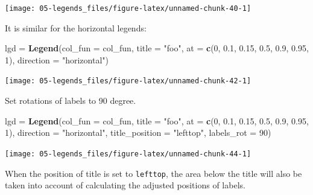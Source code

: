 \documentclass[]{book}
\newenvironment{Shaded}{\begin{snugshade}}{\end{snugshade}}
\newcommand{\KeywordTok}[1]{\textcolor[rgb]{0.13,0.29,0.53}{\textbf{#1}}}
\newcommand{\DataTypeTok}[1]{\textcolor[rgb]{0.13,0.29,0.53}{#1}}
\newcommand{\DecValTok}[1]{\textcolor[rgb]{0.00,0.00,0.81}{#1}}
\newcommand{\FloatTok}[1]{\textcolor[rgb]{0.00,0.00,0.81}{#1}}
\newcommand{\StringTok}[1]{\textcolor[rgb]{0.31,0.60,0.02}{#1}}
\newcommand{\NormalTok}[1]{#1}
\theoremstyle{definition}
\theoremstyle{definition}
\theoremstyle{definition}
\theoremstyle{remark}
\begin{document}
\begin{center}\texttt{[image: 05-legends\_files/figure-latex/unnamed-chunk-40-1]} \end{center}

It is similar for the horizontal legends:

\begin{Shaded}
\begin{Highlighting}[]
\NormalTok{lgd =}\StringTok{ }\KeywordTok{Legend}\NormalTok{(}\DataTypeTok{col_fun =}\NormalTok{ col_fun, }\DataTypeTok{title =} \StringTok{"foo"}\NormalTok{, }\DataTypeTok{at =} \KeywordTok{c}\NormalTok{(}\DecValTok{0}\NormalTok{, }\FloatTok{0.1}\NormalTok{, }\FloatTok{0.15}\NormalTok{, }\FloatTok{0.5}\NormalTok{, }\FloatTok{0.9}\NormalTok{, }\FloatTok{0.95}\NormalTok{, }\DecValTok{1}\NormalTok{),}
    \DataTypeTok{direction =} \StringTok{"horizontal"}\NormalTok{)}
\end{Highlighting}
\end{Shaded}

\begin{center}\texttt{[image: 05-legends\_files/figure-latex/unnamed-chunk-42-1]} \end{center}

Set rotations of labels to 90 degree.

\begin{Shaded}
\begin{Highlighting}[]
\NormalTok{lgd =}\StringTok{ }\KeywordTok{Legend}\NormalTok{(}\DataTypeTok{col_fun =}\NormalTok{ col_fun, }\DataTypeTok{title =} \StringTok{"foo"}\NormalTok{, }\DataTypeTok{at =} \KeywordTok{c}\NormalTok{(}\DecValTok{0}\NormalTok{, }\FloatTok{0.1}\NormalTok{, }\FloatTok{0.15}\NormalTok{, }\FloatTok{0.5}\NormalTok{, }\FloatTok{0.9}\NormalTok{, }\FloatTok{0.95}\NormalTok{, }\DecValTok{1}\NormalTok{),}
    \DataTypeTok{direction =} \StringTok{"horizontal"}\NormalTok{, }\DataTypeTok{title_position =} \StringTok{"lefttop"}\NormalTok{, }\DataTypeTok{labels_rot =} \DecValTok{90}\NormalTok{)}
\end{Highlighting}
\end{Shaded}

\begin{center}\texttt{[image: 05-legends\_files/figure-latex/unnamed-chunk-44-1]} \end{center}

When the position of title is set to \texttt{lefttop}, the area below
the title will also be taken into account of calculating the adjusted
positions of labels.
\end{document}
